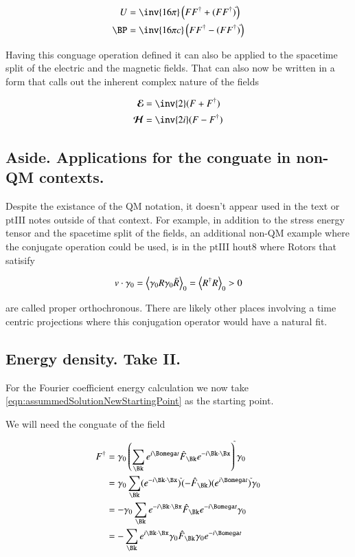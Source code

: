 \documentclass{article}
\newcommand{\EE}[0]{\boldsymbol{\mathcal{E}}}
\newcommand{\HH}[0]{\boldsymbol{\mathcal{H}}}
\begin{document}
\begin{align}
U &= \inv{16 \pi} \left(F F^\dagger + (F F^\dagger)^{\tilde{}} \right) \\
\BP &= \inv{16 \pi c} \left(F F^\dagger - (F F^\dagger)^{\tilde{}} \right)
\end{align}

Having this conguage operation defined it can also be applied to the
spacetime split of the electric and the magnetic fields.  That can also now be written in a form
that calls out the inherent complex nature of the fields

\begin{align}
\EE &= \inv{2}(F + F^\dagger ) \\
\HH &= \inv{2i}(F - F^\dagger )
\end{align}

\subsection{ Aside.  Applications for the conguate in non-QM contexts. }

Despite the existance of the QM notation, it doesn't appear used in the text or ptIII notes outside of that context.
For example,
in addition to the
stress energy tensor and the spacetime split of the fields, an additional non-QM example
where the conjugate operation could be used, is in the ptIII hout8 where Rotors that satisify

\begin{align}
v \cdot \gamma_0 = {\left\langle{{\gamma_0 R \gamma_0 \tilde{R}}}\right\rangle}_{0} = {\left\langle{{R^\dagger R}}\right\rangle}_{0} > 0
\end{align}

are called proper orthochronous.  There are likely other places involving a time centric projections where this
conjugation operator would have a natural fit.


\subsection{ Energy density. Take II. }

For the Fourier coefficient energy calculation we now take \ref{eqn:assummedSolutionNewStartingPoint} as the starting point.

We will need the conguate of the field

\begin{align*}
F^\dagger 
&= \gamma_0 
\left(
\sum_{\Bk} 
e^{i \Bomega t}
\hat{F}_{\Bk}
e^{-i \Bk \cdot \Bx}
\right)
^{\tilde{}}
\gamma_0 \\
&= \gamma_0 \sum_{\Bk} 
(e^{-i \Bk \cdot \Bx})^{\tilde{}}
(-\hat{F}_{\Bk})
(e^{i \Bomega t})^{\tilde{}}
\gamma_0 \\
&= -\gamma_0 \sum_{\Bk} 
e^{-i \Bk \cdot \Bx}
\hat{F}_{\Bk}
e^{-i \Bomega t}
\gamma_0 \\
&= -\sum_{\Bk} 
e^{i \Bk \cdot \Bx}
\gamma_0
\hat{F}_{\Bk}
\gamma_0
e^{-i \Bomega t}
\\
\end{align*}
\end{document}
